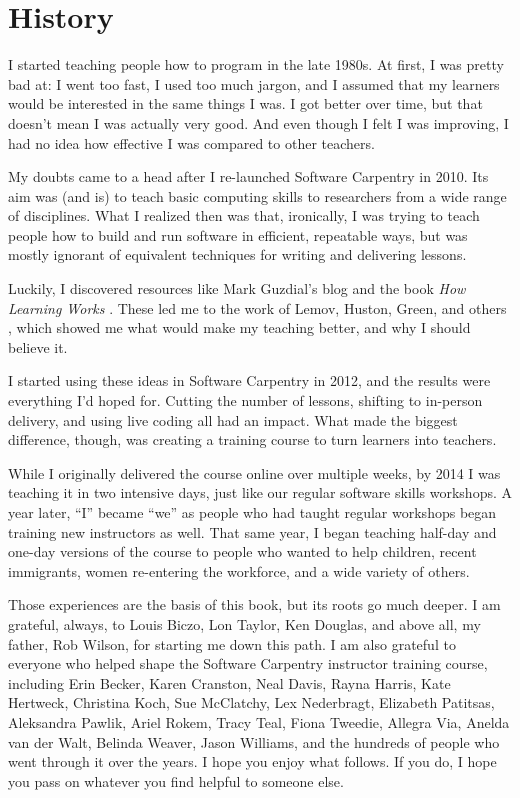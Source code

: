 \section*{History}

I started teaching people how to program in the late 1980s.  At first,
I was pretty bad at: I went too fast, I used too much jargon, and I
assumed that my learners would be interested in the same things I was.
I got better over time, but that doesn't mean I was actually very
good.  And even though I felt I was improving, I had no idea how
effective I was compared to other teachers.

My doubts came to a head after I re-launched Software Carpentry in
2010.  Its aim was (and is) to teach basic computing skills to
researchers from a wide range of disciplines.  What I realized then
was that, ironically, I was trying to teach people how to build and
run software in efficient, repeatable ways, but was mostly ignorant of
equivalent techniques for writing and delivering lessons.

Luckily, I discovered resources like Mark Guzdial's blog
\cite{bib:guzdial-blog} and the book \emph{How Learning
Works} \cite{bib:ambrose-hlw}.  These led me to the work of Lemov,
Huston, Green, and others
\cite{bib:lemov-champion,bib:huston-dont-know,bib:green-babt},
which showed me what would make my teaching better, and why I should
believe it.

I started using these ideas in Software Carpentry in 2012, and the
results were everything I'd hoped for.  Cutting the number of lessons,
shifting to in-person delivery, and using live coding all had an
impact.  What made the biggest difference, though, was creating a
training course to turn learners into teachers.

While I originally delivered the course online over multiple weeks, by
2014 I was teaching it in two intensive days, just like our regular
software skills workshops.  A year later, ``I'' became ``we'' as
people who had taught regular workshops began training new instructors
as well.  That same year, I began teaching half-day and one-day
versions of the course to people who wanted to help children, recent
immigrants, women re-entering the workforce, and a wide variety of
others.

Those experiences are the basis of this book, but its roots go much
deeper.  I am grateful, always, to Louis Biczo, Lon Taylor, Ken
Douglas, and above all, my father, Rob Wilson, for starting me down
this path.  I am also grateful to everyone who helped shape the
Software Carpentry instructor training course, including Erin Becker,
Karen Cranston, Neal Davis, Rayna Harris, Kate Hertweck, Christina
Koch, Sue McClatchy, Lex Nederbragt, Elizabeth Patitsas, Aleksandra
Pawlik, Ariel Rokem, Tracy Teal, Fiona Tweedie, Allegra Via, Anelda
van der Walt, Belinda Weaver, Jason Williams, and the hundreds of
people who went through it over the years.  I hope you enjoy what
follows.  If you do, I hope you pass on whatever you find helpful to
someone else.

